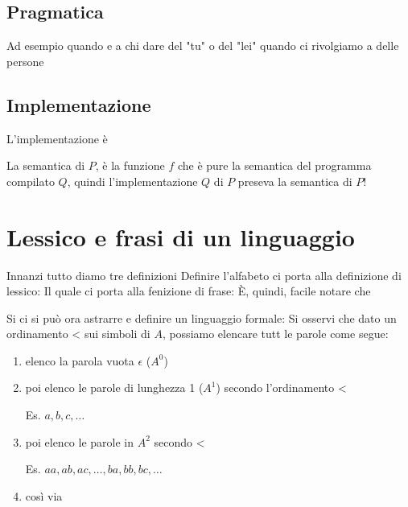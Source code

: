 \subsection{Pragmatica}
Ad esempio quando e a chi dare del "tu" o del "lei" quando ci rivolgiamo a delle persone

\subsection{Implementazione}
L'implementazione è 


La semantica di $P$, è la funzione $f$ che è pure la semantica del programma compilato $Q$, quindi l'implementazione $Q$ di $P$ preseva la semantica di $P$!

\section{Lessico e frasi di un linguaggio}
Innanzi tutto diamo tre definizioni
Definire l'alfabeto ci porta alla definizione di lessico:
Il quale ci porta alla fenizione di frase:
È, quindi, facile notare che 

Si ci si può ora astrarre e definire un linguaggio formale:
Si osservi che  dato un ordinamento < sui simboli di $A$, possiamo elencare tutt le parole come segue:
\begin{enumerate}
    \item elenco la parola vuota $\epsilon$ ($A^0$)
    \item poi elenco le parole di lunghezza 1 ($A^1$) secondo l'ordinamento <
    
    Es. $a,b,c,\dots$
    \item poi elenco le parole in $A^2$ secondo <
    
    Es. $aa, ab, ac, \dots, ba, bb, bc, \dots$
    \item così via
\end{enumerate}


